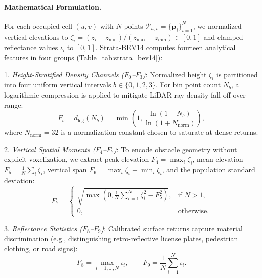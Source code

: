 \paragraph{Mathematical Formulation.}
For each occupied cell $(u, v)$ with $N$ points $\mathcal{P}_{u, v} = \{\mathbf{p}_i\}_{i=1}^N$, we normalized vertical elevations to $\zeta_i = (z_i - z_{\min}) / (z_{\max} - z_{\min}) \in [0, 1]$ and clamped reflectance values $\iota_i$ to $[0, 1]$. Strata-BEV14 computes fourteen analytical features in four groups (Table~\ref{tab:strata_bev14}):

1. \textit{Height-Stratified Density Channels ($F_0$--$F_3$)}: Normalized height $\zeta_i$ is partitioned into four uniform vertical intervals $b \in \{0, 1, 2, 3\}$. For bin point count $N_b$, a logarithmic compression is applied to mitigate LiDAR ray density fall-off over range:
\begin{equation}
    F_b = d_{\log}(N_b) = \min\left(1, \frac{\ln(1 + N_b)}{\ln(1 + N_{\mathrm{norm}})}\right),
    \label{eq:density_encoding}
\end{equation}
where $N_{\mathrm{norm}} = 32$ is a normalization constant chosen to saturate at dense returns.

2. \textit{Vertical Spatial Moments ($F_4$--$F_7$)}: To encode obstacle geometry without explicit voxelization, we extract peak elevation $F_4 = \max_i \zeta_i$, mean elevation $F_5 = \frac{1}{N}\sum_i \zeta_i$, vertical span $F_6 = \max_i \zeta_i - \min_i \zeta_i$, and the population standard deviation:
\begin{equation}
    F_7 = \begin{cases}
        \sqrt{\max\left(0, \frac{1}{N} \sum_{i=1}^N \zeta_i^2 - F_5^2\right)}, & \text{if } N > 1, \\
        0, & \text{otherwise}.
    \end{cases}
    \label{eq:z_std_encoding}
\end{equation}

3. \textit{Reflectance Statistics ($F_8$--$F_9$)}: Calibrated surface returns capture material discrimination (e.g., distinguishing retro-reflective license plates, pedestrian clothing, or road signs):
\begin{equation}
    F_8 = \max_{i=1,\dots,N} \iota_i, \qquad F_9 = \frac{1}{N} \sum_{i=1}^N \iota_i.
    \label{eq:intensity_encoding}
\end{equation}

